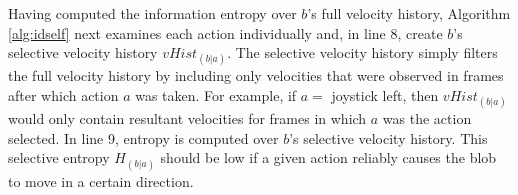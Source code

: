 \documentclass{sig-alternate}
\begin{document}
Having computed the information entropy over $b$'s full velocity history, Algorithm \ref{alg:idself} next examines each action individually and, in line 8, create $b$'s selective velocity history $vHist_{(b|a)}$. The selective velocity history simply filters the full velocity history by including only velocities that were observed in frames after which action $a$ was taken. For example, if $a = $ joystick left, then $vHist_{(b|a)}$ would only contain resultant velocities for frames in which $a$ was the action selected. In line 9, entropy is computed over $b$'s selective velocity history. This selective entropy $H_{(b|a)}$ should be low if a given action reliably causes the blob to move in a certain direction.

\begin{figure}
  \centering
  \hspace{.1in}
  \hspace{.1in}
  \hspace{.1in}

\end{figure}
\end{document}
